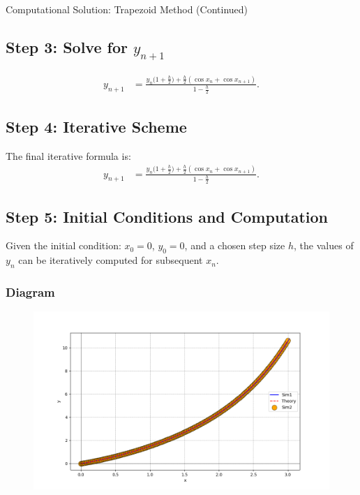 \documentclass{beamer}
\begin{document}
	\begin{frame}{Computational Solution: Trapezoid Method (Continued)}
		\subsection*{Step 3: Solve for $y_{n+1}$}
		
		\begin{align}
			y_{n+1} &= \frac{y_n \big( 1 + \frac{h}{2} \big) + \frac{h}{2} (\cos x_n + \cos x_{n+1})}{1 - \frac{h}{2}}.
		\end{align}
		
		\subsection*{Step 4: Iterative Scheme}
		
		The final iterative formula is:
		\begin{align}
			y_{n+1} &= \frac{y_n \big( 1 + \frac{h}{2} \big) + \frac{h}{2} (\cos x_n + \cos x_{n+1})}{1 - \frac{h}{2}}.
		\end{align}
		
		\subsection*{Step 5: Initial Conditions and Computation}
		
		Given the initial condition:
		$x_0 = 0$, $y_0 = 0$,
		and a chosen step size $h$, the values of $y_n$ can be iteratively computed for subsequent $x_n$.\\
	\end{frame}
	
	\begin{frame}
		\frametitle{Diagram}
		\begin{figure}[!ht]
			\centering
			\includegraphics[width=\linewidth]{figs/Fig.png}
		\end{figure}
	\end{frame}
\end{document}
